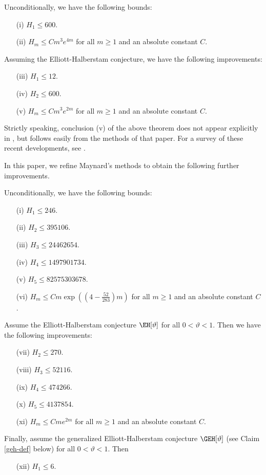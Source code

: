\begin{theorem}  Unconditionally, we have the following bounds:
\begin{itemize}
\item[(i)] $H_1 \leq 600$.
\item[(ii)] $H_m \leq C m^3 e^{4m}$ for all $m \geq 1$ and an absolute constant $C$.
\end{itemize}
Assuming the Elliott-Halberstam conjecture, we have the following improvements:
\begin{itemize}
\item[(iii)] $H_1 \leq 12$.
\item[(iv)] $H_2 \leq 600$.
\item[(v)] $H_m \leq C m^3 e^{2m}$ for all $m \geq 1$ and an absolute constant $C$.
\end{itemize}
\end{theorem}

Strictly speaking, conclusion (v) of the above theorem does not appear explicitly in \cite{maynard-new}, but follows easily from the methods of that paper.  For a survey of these recent developments, see \cite{granville}.

In this paper, we refine Maynard's methods to obtain the following further improvements.

\begin{theorem}\label{main} Unconditionally, we have the following bounds:
\begin{itemize}
\item[(i)] $H_1 \leq 246$.   
\item[(ii)] $H_2 \leq \num{395106}$. 
\item[(iii)] $H_3 \leq \num{24462654}$. 
\item[(iv)] $H_4 \leq \num{1497901734}$.  
\item[(v)] $H_5 \leq \num{82575303678}$. 
\item[(vi)] $H_m \leq C m \exp( (4 - \frac{52}{283}) m )$ for all $m \geq 1$ and an absolute constant $C$.
\end{itemize}
Assume the Elliott-Halberstam conjecture $\EH[\vartheta]$ for all $0 < \vartheta < 1$.  Then we have the following improvements:
\begin{itemize}
\item[(vii)] $H_2 \leq 270$.
\item[(viii)] $H_3 \leq \num{52116}$.
\item[(ix)] $H_4 \leq \num{474266}$.
\item[(x)] $H_5 \leq \num{4137854}$.
\item[(xi)] $H_m \leq Cme^{2m}$ for all $m \geq 1$ and an absolute constant $C$.
\end{itemize}
Finally, assume the generalized Elliott-Halberstam conjecture $\GEH[\vartheta]$ (see Claim \ref{geh-def} below) for all $0 < \vartheta < 1$.  Then
\begin{itemize}
\item[(xii)] $H_1 \leq 6$.
\end{itemize}
\end{theorem}

